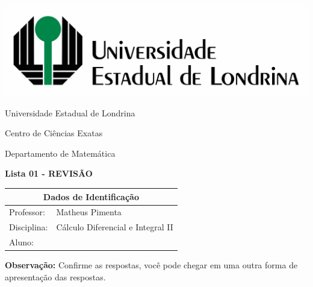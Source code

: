 \documentclass[oneside,a4paper,12pt]{article}
\newcommand{\universidade}{Universidade Estadual de Londrina}
\newcommand{\centro}{Centro de Ciências Exatas}
\newcommand{\departamento}{Departamento de Matemática}
\newcommand{\curso}{Ciência da Computação}
\newcommand{\professores}{Matheus Pimenta}
\newcommand{\disciplina}{Cálculo Diferencial e Integral II}
\begin{document}
	\pagestyle{empty}
	
	\begin{center}
		\includegraphics[width=\linewidth/2]{logo.jpg}%
	 	\vspace{2pt} 	
		
		\universidade
		\par
		\centro
		\par
		\departamento
		\par
		\par
		\vspace{12pt}
		\LARGE \textbf{Lista 01 - REVISÃO}
		
	\end{center}
	
	\vspace{12pt}
	
	\begin{tabular}{ |l|p{12cm}| }
		
		\hline
		\multicolumn{2}{|c|}{\textbf{Dados de Identificação}} \\
		\hline
		Professor:         &    \professores           \\
		\hline
		Disciplina:        &    \disciplina          \\
		\hline
		Aluno:             &                   \\
		\hline
		
	\end{tabular}
	\vspace{6pt}
	
	{\bf Observação:} Confirme as respostas, você pode chegar em uma outra forma de apresentação das respostas.
	
	\begin{snugshade}
	\end{snugshade}
\end{document}

